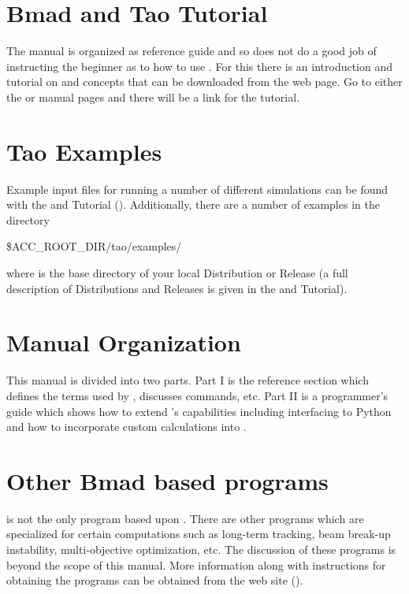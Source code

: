 \section{Bmad and Tao Tutorial}
\label{s:tutorial}

\vspace{0.1in}
The \tao manual is organized as reference guide and so does not do a good job of instructing the
beginner as to how to use \tao. For this there is an introduction and tutorial on \bmad and \tao
concepts that can be downloaded from the \bmad web page. Go to either the \bmad or \tao manual pages
and there will be a link for the tutorial.

\section{Tao Examples}
\label{s:examples}

Example input files for running a number of different simulations can be found with the \bmad and \tao
Tutorial (). Additionally, there are a number of examples in the directory
\begin{example}
  \$ACC_ROOT_DIR/tao/examples/
\end{example}
where  is the base directory of your local \bmad Distribution or Release (a full description
of \bmad Distributions and Releases is given in the \bmad and \tao Tutorial).

\section{Manual Organization}

This manual is divided into two parts. Part I is the reference section which defines the terms used
by \tao, discusses \tao commands, etc. Part II is a programmer's guide which shows how to extend
\tao's capabilities including interfacing to Python and how to incorporate custom calculations into
\tao.

\section{Other Bmad based programs}
\label{s:other}

\tao is not the only program based upon \bmad. There are other programs which are specialized for
certain computations such as long-term tracking, beam break-up instability, multi-objective
optimization, etc. The discussion of these programs is beyond the scope of this manual. More
information along with instructions for obtaining the programs can be obtained from the \bmad web site ().

